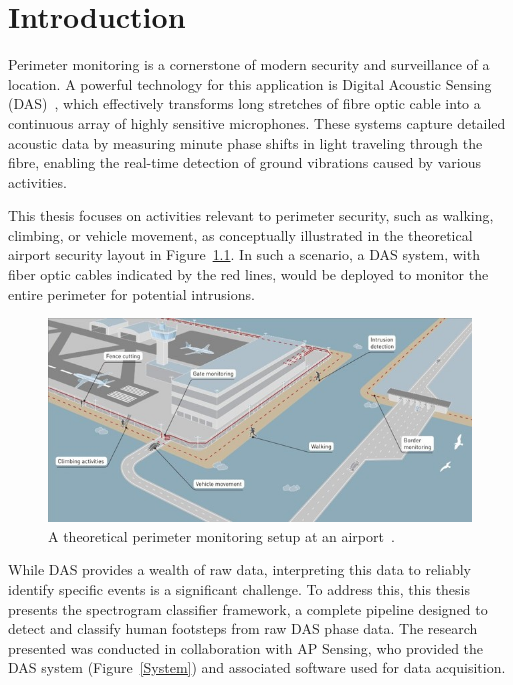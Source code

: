 %
%
\chapter{Introduction}

Perimeter monitoring is a cornerstone of modern security and surveillance of a location. A powerful technology for this application is Digital Acoustic Sensing (DAS)~\cite{duckworth}, which effectively transforms long stretches of fibre optic cable into a continuous array of highly sensitive microphones. These systems capture detailed acoustic data by measuring minute phase shifts in light traveling through the fibre, enabling the real-time detection of ground vibrations caused by various activities.

This thesis focuses on activities relevant to perimeter security, such as walking, climbing, or vehicle movement, as conceptually illustrated in the theoretical airport security layout in Figure~\ref{Airport}. In such a scenario, a DAS system, with fiber optic cables indicated by the red lines, would be deployed to monitor the entire perimeter for potential intrusions.

\begin{figure}[h]
    \centering
    \includegraphics[width=\linewidth]{Bilder/jpg/Airport.jpg}
    \caption{A theoretical perimeter monitoring setup at an airport~\cite{Airport_Image}.}
    \label{Airport}
\end{figure}

While DAS provides a wealth of raw data, interpreting this data to reliably identify specific events is a significant challenge. To address this, this thesis presents the spectrogram classifier framework, a complete pipeline designed to detect and classify human footsteps from raw DAS phase data. The research presented was conducted in collaboration with AP Sensing, who provided the DAS system (Figure~\ref{System}) and associated software used for data acquisition.

